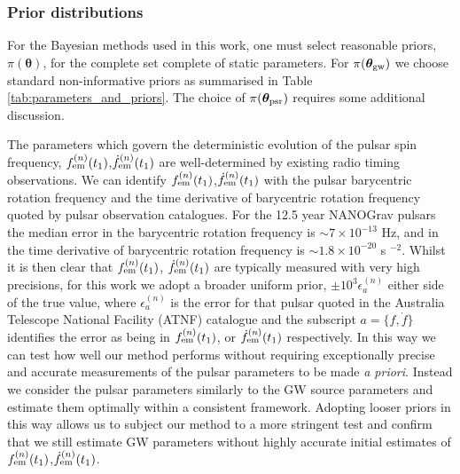 \documentclass[fleqn,usenatbib,useAMS]{mnras}
\begin{document}
\subsubsection{Prior distributions}\label{sec:priors}
For the Bayesian methods used in this work, one must select reasonable priors, $\pi(\boldsymbol{\theta})$, for the complete set complete of static parameters. For $\pi(\boldsymbol{\theta}_{\rm gw})$ we choose standard non-informative priors \citep[e.g.][]{Bhagwat2021} as summarised in Table \ref{tab:parameters_and_priors}. The choice of $\pi(\boldsymbol{\theta}_{\rm psr})$ requires some additional discussion. \newline 


The parameters which govern the deterministic evolution of the pulsar spin frequency, $f_{\rm em}^{(n)} (t_1)$,$\dot{f}_{\rm em}^{(n)} (t_1)$ are well-determined by existing radio timing observations. We can identify $f_{\rm em}^{(n)} (t_1)$,$\dot{f}_{\rm em}^{(n)} (t_1)$ with the pulsar  barycentric rotation frequency and the time derivative of barycentric rotation frequency quoted by pulsar observation catalogues. For the 12.5 year NANOGrav pulsars the median error in  the barycentric rotation frequency is $\sim 7 \times 10^{-13}$ Hz, and in the time derivative of barycentric rotation frequency is $\sim 1.8 \times 10^{-20}$ s $^{-2}$. Whilst it is then clear that $f_{\rm em}^{(n)} (t_1)$, $\dot{f}_{\rm em}^{(n)} (t_1)$ are typically measured with very high precisions, for this work we adopt a broader uniform prior, $\pm 10^3 \epsilon^{(n)}_{a}$ either side of the true value, where $\epsilon^{(n)}_{a}$ is the error for that pulsar quoted in the Australia Telescope National Facility (ATNF) catalogue and the subscript $a = \{ f, \dot{f} \}$ identifies the error as being in $f_{\rm em}^{(n)} (t_1)$, or $\dot{f}_{\rm em}^{(n)} (t_1)$ respectively. In this way we can test how well our method performs without requiring exceptionally precise and accurate measurements of the pulsar parameters to be made \textit{a priori}. Instead we consider the pulsar parameters similarly to the GW source parameters and estimate them optimally within a consistent framework. Adopting looser priors in this way allows us to subject our method to a more stringent test and confirm that we still estimate GW parameters without highly accurate initial estimates of $f_{\rm em}^{(n)} (t_1)$,$\dot{f}_{\rm em}^{(n)} (t_1)$. \newline 
\end{document}
